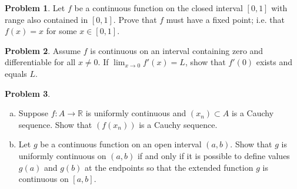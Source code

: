 \documentclass{amsart}
\newcommand{\+}[1]{\ensuremath{\mathbf{#1}}}
\newcommand{\R}{{\mathbb R}}
\renewcommand{\emptyset}{\varnothing}
\theoremstyle{definition}
\newtheorem{prob}{Problem}
\begin{document}

\begin{prob}
 Let $f$ be a continuous function on the closed
 interval $[0,1]$
 with range also contained in $[0,1]$.
 Prove that $f$ must have a fixed point;
 i.e. that $f(x) = x$ for some $x \in [0,1]$.
\end{prob}


\vspace{3mm}


\begin{prob}
Assume $f$ is continuous on an interval containing zero
and differentiable for all $x \neq 0$.
If $\lim_{x \to 0} f'(x) = L$,
show that $f'(0)$ exists and equals $L$.
\end{prob}


\vspace{3mm}


\begin{prob}
\begin{enumerate}[(a)]
 \item  Suppose $f: A \to \R$ is uniformly continuous
 and $(x_n) \subset A$ is a Cauchy sequence.
 Show that $(f(x_n))$ is a Cauchy sequence.
 \item Let $g$ be a continuous function on
 an open interval $(a,b)$.
 Show that $g$ is uniformly continuous on $(a,b)$
 if and only if it is possible to define
values $g(a)$ and $g(b)$ at the endpoints
so that the extended function $g$ is continuous on $[a,b]$.
 \end{enumerate}
\end{prob}
\end{document}

